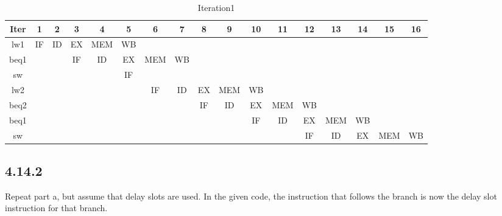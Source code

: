 \documentclass[paper=a4, fontsize=11pt]{scrartcl} %
\begin{document}
\begin{table}[hp]
    \caption{Iteration1}\label{tab:iteration1}
    \begin{center}
        \scriptsize
        \begin{tabular}{ccccccccccccccccc}
        \toprule
        \textbf{Iter} & \textbf{1} & \textbf{2} & \textbf{3} & \textbf{4} & \textbf{5}
        & \textbf{6} & \textbf{7} & \textbf{8} & \textbf{9} & \textbf{10} & \textbf{11}
        & \textbf{12} & \textbf{13} & \textbf{14} & \textbf{15} & \textbf{16} \\
        \midrule
        lw1  & IF & ID & EX & MEM & WB \\ %
        beq1 &    &    & IF & ID & EX & MEM & WB \\ %
        sw   &    &    &    &    & IF \\
        lw2  &    &    &    &    &    & IF & ID & EX & MEM & WB \\ %
        beq2 &    &    &    &    &    &    &    & IF & ID & EX & MEM & WB \\ %
        beq1 &    &    &    &    &    &    &    &    &    & IF & ID & EX & MEM & WB \\ %
        sw   &    &    &    &    &    &    &    &    &    &    &    & IF & ID & EX & MEM & WB \\
        \bottomrule
        \end{tabular}
    \end{center}
\end{table}


\subsection{4.14.2}
\begin{fancyquotes}
    Repeat part a, but assume that delay slots are used. In the given code, the instruction that follows the branch is now the delay slot instruction for that branch.
\end{fancyquotes}
\end{document}
